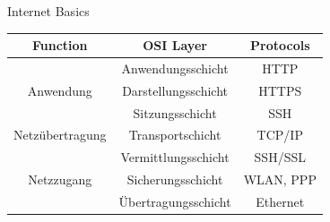 \documentclass{beamer}
\begin{document}
\begin{frame}{Internet Basics}
  \begin{center}
    \begin{tabular}{|c|c|c|}\hline
      \textbf{Function} & \textbf{OSI Layer} & \textbf{Protocols}\\\hline
      &Anwendungsschicht & HTTP\\
      Anwendung & Darstellungsschicht & HTTPS\\
      &Sitzungsschicht & SSH\\\hline
      Netzübertragung & Transportschicht & TCP/IP \\
      & Vermittlungsschicht & SSH/SSL \\\hline 
      Netzzugang & Sicherungsschicht & WLAN, PPP \\
      &Übertragungsschicht & Ethernet \\\hline
    \end{tabular}
  \end{center}
\end{frame}
\end{document}
